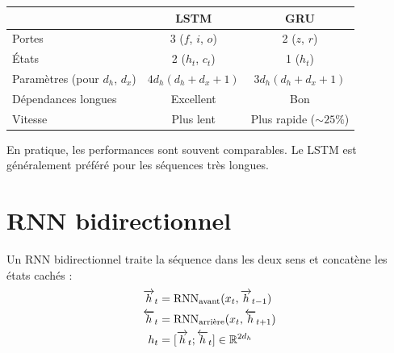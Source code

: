 \begin{remarque}
\begin{center}
\begin{tabular}{lcc}
\toprule
& \textbf{LSTM} & \textbf{GRU} \\
\midrule
Portes & 3 ($f$, $i$, $o$) & 2 ($z$, $r$) \\
\'Etats & 2 ($h_t$, $c_t$) & 1 ($h_t$) \\
Param\`etres (pour $d_h$, $d_x$) & $4 d_h(d_h + d_x + 1)$ & $3 d_h(d_h + d_x + 1)$ \\
D\'ependances longues & Excellent & Bon \\
Vitesse & Plus lent & Plus rapide ($\sim 25\%$) \\
\bottomrule
\end{tabular}
\end{center}
En pratique, les performances sont souvent comparables. Le LSTM est
g\'en\'eralement pr\'ef\'er\'e pour les s\'equences tr\`es longues.
\end{remarque}

\section{RNN bidirectionnel}
\label{sec:bidirectional}

\begin{definition}
Un RNN bidirectionnel traite la s\'equence dans les deux sens et concat\`ene
les \'etats cach\'es :
\begin{align}
\overrightarrow{h}_t &= \text{RNN}_{\text{avant}}(x_t, \overrightarrow{h}_{t-1}) \\
\overleftarrow{h}_t &= \text{RNN}_{\text{arri\`ere}}(x_t, \overleftarrow{h}_{t+1}) \\
h_t &= [\overrightarrow{h}_t ; \overleftarrow{h}_t] \in \mathbb{R}^{2 d_h}
\end{align}
\end{definition}

\begin{center}
\end{center}

